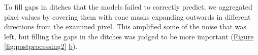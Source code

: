\documentclass[11pt, review]{elsarticle} %
\providecommand{\DIFaddtex}[1]{{\protect\color{blue}\uwave{#1}}} %
\providecommand{\DIFdeltex}[1]{{\protect\color{red}\sout{#1}}}                      %
\providecommand{\DIFaddFL}[1]{\DIFadd{#1}} %
\providecommand{\DIFdelFL}[1]{\DIFdel{#1}} %
\providecommand{\DIFaddbeginFL}{} %
\providecommand{\DIFdelbeginFL}{} %
\providecommand{\DIFdelendFL}{} %
\providecommand{\DIFadd}[1]{\texorpdfstring{\DIFaddtex{#1}}{#1}} %
\providecommand{\DIFdel}[1]{\texorpdfstring{\DIFdeltex{#1}}{}} %
\begin{document}
To fill gaps in ditches that the models failed to correctly predict, we aggregated pixel values by covering them with cone masks expanding outwards in different directions from the examined pixel. This amplified some of the noise that was left, but filling the gaps in the ditches was judged to be more important (\hyperref[fig:postprocessing2]{Figure} \ref{fig:postprocessing2} \hyperref[fig:postprocessing2]{b}).

\begin{figure} [!htb]
    \centering
    \DIFdelbeginFL %
\DIFdelFL{\hspace{5pt}
    }%
\DIFdelendFL \DIFaddbeginFL \DIFaddFL{a}{
        }\DIFaddFL{\hspace{5pt}
    b}{
}
\end{figure}
\end{document}
